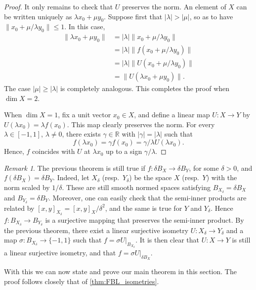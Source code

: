 \documentclass{memo-l}
\theoremstyle{definition}
\theoremstyle{remark}
\newtheorem{rem}[theorem]{Remark}
\numberwithin{section}{chapter}
\numberwithin{equation}{chapter}
\newcommand\R{\ensuremath{\mathbb{R}}}
\begin{document}
\begin{proof}
    It only remains to check that $U$ preserves the norm. An element
    of $X$ can be written uniquely as $\lambda x_0+\mu y_0$.
    Suppose first that $|\lambda |>|\mu |$, so as to have $\|x_0+\mu
    /\lambda y_0\|\le 1$. In this case,
    \begin{align*}
        \|\lambda x_0+\mu y_0\|&=|\lambda | \|x_0+\mu /\lambda y_0\|\\
        &=|\lambda | \|f(x_0+\mu /\lambda
        y_0)\|\\& =|\lambda | \|U(x_0+\mu /\lambda y_0)\|\\
                               &=\|U(\lambda x_0+\mu y_0)\|.
    \end{align*}
    The case $|\mu |\ge |\lambda |$ is completely analogous. This
    completes the proof when $\dim X=2$.

    When $\dim X=1$, fix a unit vector $x_0\in X$, and define a linear
    map $U\colon X\to Y$ by $U(\lambda x_0)=\lambda f(x_0)$. This map
    clearly preserves the norm. For every $\lambda \in [-1,1]$,
    $\lambda \neq 0$, there
    exists $\gamma \in \R$ with $|\gamma |=|\lambda |$ such that
    \[
    f(\lambda x_0)=\gamma f(x_0)=\gamma /\lambda U(\lambda x_0).
    \]
    Hence, $f$ coincides with $U$ at $\lambda x_0$ up to a sign $\gamma
    /\lambda $.
\end{proof}

\begin{rem}
    The previous theorem is still true if $f\colon \delta B_X\to
    \delta B_Y$, for some $\delta >0$, and $f(\delta B_X)=\delta B_Y$. Indeed, let $X_\delta$ (resp.\
    $Y_\delta$) be the
    space $X$ (resp.\ $Y$) with the norm scaled by $1/\delta$.
    These are still smooth normed spaces satisfying $B_{X_\delta
    }=\delta B_X$ and $B_{Y_\delta }=\delta B_Y$. Moreover, one can
    easily check that the semi-inner products are related by
    $[x,y]_{X_\delta }=[x,y]_X/\delta ^2$, and the same is true for $Y$ and
    $Y_\delta $. Hence $f\colon B_{X_\delta }\to B_{Y_\delta }$ is a
    surjective mapping that preserves the semi-inner product. By
    the previous theorem, there exist a linear surjective isometry
    $U\colon X_\delta \to Y_\delta $ and a map $\sigma \colon
    B_{X_\delta }\to \{-1,1\}$ such that $f=\sigma U|_{B_{X_\delta
    }}$. It is then clear that $U\colon X\to Y$ is still a linear
    surjective isometry, and that $f=\sigma U|_{\delta B_X}$.
\end{rem}

With this we can now state and prove our main theorem in this section. The proof
follows closely that of \cref{thm:FBL_isometries}.
\end{document}
